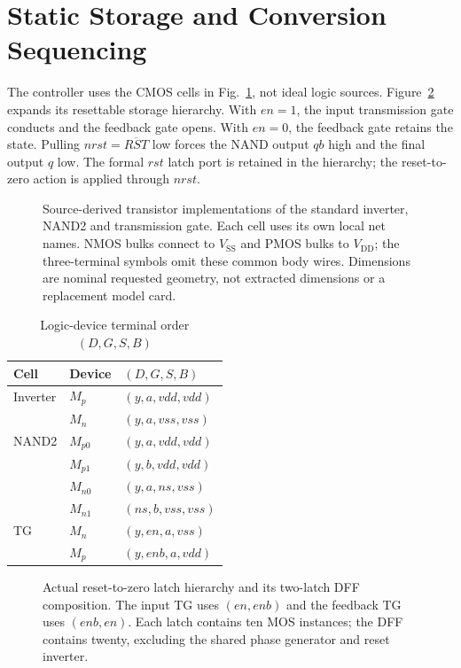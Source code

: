 \section{Static Storage and Conversion Sequencing}
The controller uses the CMOS cells in Fig.~\ref{fig:logic-cells}, not ideal
logic sources. Figure~\ref{fig:logic-latch} expands its resettable storage
hierarchy. With $en=1$, the input transmission gate conducts and the feedback
gate opens. With $en=0$, the feedback gate retains the state. Pulling
$nrst=\overline{RST}$ low forces the NAND output $qb$ high and the final
output $q$ low. The formal $rst$ latch port is retained in the hierarchy;
the reset-to-zero action is applied through $nrst$.

\begin{figure}[!t]
\centering
\resizebox{.97\textwidth}{!}{}
\caption{Source-derived transistor implementations of the standard inverter,
NAND2 and transmission gate. Each cell uses its own local net names. NMOS
bulks connect to $V_{\mathrm{SS}}$ and PMOS bulks to $V_{\mathrm{DD}}$;
the three-terminal symbols omit these common body wires. Dimensions are
nominal requested geometry, not extracted dimensions or a replacement model card.}
\label{fig:logic-cells}
\end{figure}

\begin{table}[!t]\centering
\caption{Logic-device terminal order $(D,G,S,B)$}
\label{tab:logic-terminals}
\begin{tabular}{lll}\toprule
Cell & Device & $(D,G,S,B)$\\\midrule
Inverter & $M_p$ & $(y,a,vdd,vdd)$\\
 & $M_n$ & $(y,a,vss,vss)$\\
NAND2 & $M_{p0}$ & $(y,a,vdd,vdd)$\\
 & $M_{p1}$ & $(y,b,vdd,vdd)$\\
 & $M_{n0}$ & $(y,a,ns,vss)$\\
 & $M_{n1}$ & $(ns,b,vss,vss)$\\
TG & $M_n$ & $(y,en,a,vss)$\\
 & $M_p$ & $(y,enb,a,vdd)$\\\bottomrule
\end{tabular}
\end{table}

\begin{figure}[!t]
\centering
\resizebox{.97\textwidth}{!}{}
\caption{Actual reset-to-zero latch hierarchy and its two-latch DFF composition.
The input TG uses $(en,enb)$ and the feedback TG uses $(enb,en)$.
Each latch contains ten MOS instances; the DFF contains twenty, excluding
the shared phase generator and reset inverter.}
\label{fig:logic-latch}
\end{figure}

